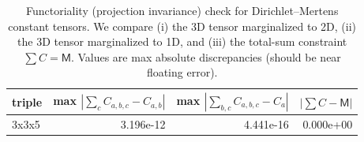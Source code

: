 \begin{table}[H]
\centering
\scriptsize
\setlength{\tabcolsep}{6pt}
\caption{Functoriality (projection invariance) check for Dirichlet--Mertens constant tensors. We compare (i) the 3D tensor marginalized to 2D, (ii) the 3D tensor marginalized to 1D, and (iii) the total-sum constraint $\sum C=\mathsf{M}$. Values are max absolute discrepancies (should be near floating error).}
\label{tab:real_input_40_dirichlet_mertens_functoriality}
\begin{tabular}{l r r r}
\toprule
triple & max $|\sum_c C_{a,b,c}-C_{a,b}|$ & max $|\sum_{b,c} C_{a,b,c}-C_a|$ & $|\sum C-\mathsf{M}|$\\
\midrule
3x3x5 & 3.196e-12 & 4.441e-16 & 0.000e+00\\
\bottomrule
\end{tabular}
\end{table}
